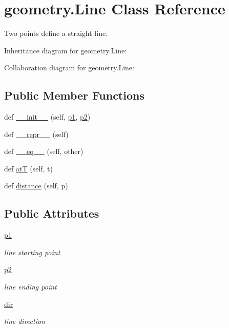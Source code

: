 \hypertarget{classgeometry_1_1Line}{}\section{geometry.\+Line Class Reference}
\label{classgeometry_1_1Line}


Two points define a straight line.  




Inheritance diagram for geometry.\+Line\+:


Collaboration diagram for geometry.\+Line\+:
\subsection*{Public Member Functions}
\begin{DoxyCompactItemize}
\item 
def \hyperlink{classgeometry_1_1Line_a0798ab42b8ca969cc6b686085642e023}{\+\_\+\+\_\+init\+\_\+\+\_\+} (self, \hyperlink{classgeometry_1_1Line_aa46ea22a1b33099cbfa26a1646595a40}{p1}, \hyperlink{classgeometry_1_1Line_a10b5fbbd99ed5d63848a09e50a782cdf}{p2})
\item 
def \hyperlink{classgeometry_1_1Line_ac5887251dccbea9ec1fbab00dcfc42aa}{\+\_\+\+\_\+repr\+\_\+\+\_\+} (self)
\item 
def \hyperlink{classgeometry_1_1Line_a0b21cc539996c6afb8f0fc1763d9d174}{\+\_\+\+\_\+eq\+\_\+\+\_\+} (self, other)
\item 
def \hyperlink{classgeometry_1_1Line_a05b2f8b25c0025ba627523dc137f66cb}{atT} (self, t)
\item 
def \hyperlink{classgeometry_1_1Line_ac6b10e2377ad195ca3c2a6148b1aa770}{distance} (self, p)
\end{DoxyCompactItemize}
\subsection*{Public Attributes}
\begin{DoxyCompactItemize}
\item 
\hyperlink{classgeometry_1_1Line_aa46ea22a1b33099cbfa26a1646595a40}{p1}
\begin{DoxyCompactList}\small\item\em line starting point \end{DoxyCompactList}\item 
\hyperlink{classgeometry_1_1Line_a10b5fbbd99ed5d63848a09e50a782cdf}{p2}
\begin{DoxyCompactList}\small\item\em line ending point \end{DoxyCompactList}\item 
\hyperlink{classgeometry_1_1Line_a184c36a24c5e66becce19c0fe53c8b95}{dir}
\begin{DoxyCompactList}\small\item\em line direction \end{DoxyCompactList}\end{DoxyCompactItemize}


